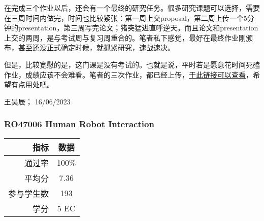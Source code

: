 在完成三个作业以后，还会有一个最终的研究任务。很多研究课题可以选择，需要在三周时间内做完，时间也比较紧张：第一周上交proposal，第二周上传一个5分钟的presentation，第三周写完论文；猪突猛进直呼逆天。而且论文和presentation上交的两周，是与考试周与复习周重合的。笔者私下感觉，最好在最终作业刚颁布，甚至还没正式确定时候，就抓紧研究，速战速决。

但是，比较宽慰的是，这门课是没有考试的。也就是说，平时若是愿意花时间死磕作业，成绩应该不会难看。笔者的三次作业，都已经上传，\href{https://drive.google.com/drive/folders/1mJun-EmYGX1DovFISP9lXZNkdnutQpuh?usp=sharing}{\uline{于此链接可以查看}}，希望有点用处吧。
\begin{flushright}
王昊辰； 16/06/2023
\end{flushright}


\subsubsection{RO47006 Human Robot Interaction}
\begin{minipage}{0.45\textwidth}
\centering
{}
\end{minipage}%
\begin{minipage}{0.45\textwidth}
\raggedleft
\begin{tabular}{r|c}
\textbf{指标} & \textbf{数据} \\ \hline
通过率 & 100\% \\ 
平均分 & 7.36 \\ 
参与学生数 & 193 \\ 
学分 & 5 EC\\
\end{tabular}
\end{minipage}\\

